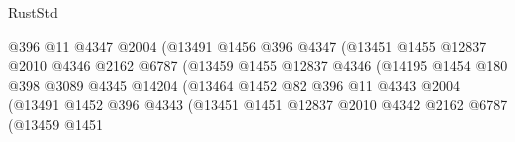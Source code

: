 \begin{lexlean}{RustStd}
\begin{coremodule}
{\begin{coremodule}
{{{{{{{{{{{{{{{{{{{{{{{{{{{{{{{                                            @396
                                            @11
                                            @4347
                                            @2004
                                            (@13491
                                              @1456
                                              @396
                                              @4347
                                              (@13451
                                                @1455
                                                @12837
                                                @2010
                                                @4346
                                                @2162
                                                @6787
                                                (@13459
                                                  @1455
                                                  @12837
                                                  @4346
                                                  (@14195
                                                    @1454
                                                    @180
                                                    @398
                                                    @3089
                                                    @4345
                                                    @14204
                                                    (@13464
                                                      @1452
                                                      @82
                                                      @396
                                                      @11
                                                      @4343
                                                      @2004
                                                      (@13491
                                                        @1452
                                                        @396
                                                        @4343
                                                        (@13451
                                                          @1451
                                                          @12837
                                                          @2010
                                                          @4342
                                                          @2162
                                                          @6787
                                                          (@13459
                                                            @1451
}}}}}}}}}}}}}}}}}}}}}}}}}}}}}}}
\end{coremodule}}
\end{coremodule}
\end{lexlean}
